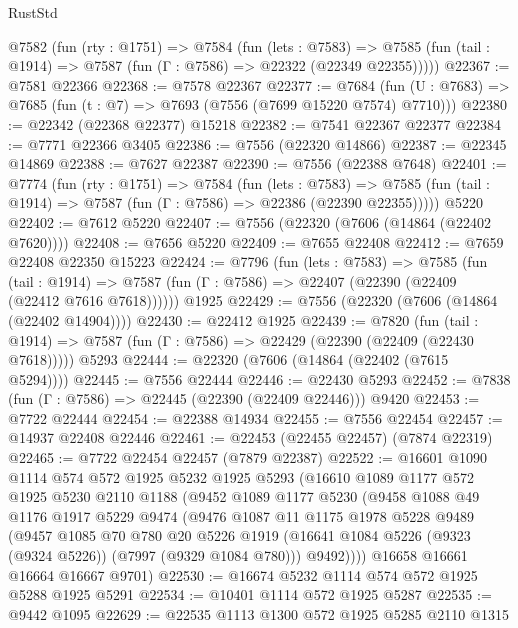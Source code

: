 \begin{lexlean}{RustStd}
\begin{coremodule}
{\begin{coremodule}
{{{{{{{{{{{{{{{{{{{{{{{{{{{{{{{{{{{{{{{{{{{  @7582
    (fun (rty : @1751) =>
    @7584
      (fun (lets : @7583) =>
      @7585 (fun (tail : @1914) => @7587 (fun (Γ : @7586) => @22322 (@22349 @22355)))))
@22367 := @7581 @22366
@22368 := @7578 @22367
@22377 := @7684
    (fun (U : @7683) => @7685 (fun (t : @7) => @7693 (@7556 (@7699 @15220 @7574) @7710)))
@22380 := @22342 (@22368 @22377) @15218
@22382 := @7541 @22367 @22377
@22384 := @7771 @22366 @3405
@22386 := @7556 (@22320 @14866)
@22387 := @22345 @14869
@22388 := @7627 @22387
@22390 := @7556 (@22388 @7648)
@22401 := @7774
    (fun (rty : @1751) =>
    @7584
      (fun (lets : @7583) =>
      @7585 (fun (tail : @1914) => @7587 (fun (Γ : @7586) => @22386 (@22390 @22355)))))
    @5220
@22402 := @7612 @5220
@22407 := @7556 (@22320 (@7606 (@14864 (@22402 @7620))))
@22408 := @7656 @5220
@22409 := @7655 @22408
@22412 := @7659 @22408 @22350 @15223
@22424 := @7796
    (fun (lets : @7583) =>
    @7585
      (fun (tail : @1914) =>
      @7587 (fun (Γ : @7586) => @22407 (@22390 (@22409 (@22412 @7616 @7618))))))
    @1925
@22429 := @7556 (@22320 (@7606 (@14864 (@22402 @14904))))
@22430 := @22412 @1925
@22439 := @7820
    (fun (tail : @1914) => @7587 (fun (Γ : @7586) => @22429 (@22390 (@22409 (@22430 @7618)))))
    @5293
@22444 := @22320 (@7606 (@14864 (@22402 (@7615 @5294))))
@22445 := @7556 @22444
@22446 := @22430 @5293
@22452 := @7838 (fun (Γ : @7586) => @22445 (@22390 (@22409 @22446))) @9420
@22453 := @7722 @22444
@22454 := @22388 @14934
@22455 := @7556 @22454
@22457 := @14937 @22408 @22446
@22461 := @22453 (@22455 @22457) (@7874 @22319)
@22465 := @7722 @22454 @22457 (@7879 @22387)
@22522 := @16601
    @1090
    @1114
    @574
    @572
    @1925
    @5232
    @1925
    @5293
    (@16610
      @1089
      @1177
      @572
      @1925
      @5230
      @2110
      @1188
      (@9452
        @1089
        @1177
        @5230
        (@9458
          @1088
          @49
          @1176
          @1917
          @5229
          @9474
          (@9476
            @1087
            @11
            @1175
            @1978
            @5228
            @9489
            (@9457
              @1085
              @70
              @780
              @20
              @5226
              @1919
              (@16641 @1084 @5226 (@9323 (@9324 @5226)) (@7997 (@9329 @1084 @780)))
              @9492))))
      @16658
      @16661
      @16664
      @16667
      @9701)
@22530 := @16674 @5232 @1114 @574 @572 @1925 @5288 @1925 @5291
@22534 := @10401 @1114 @572 @1925 @5287
@22535 := @9442 @1095
@22629 := @22535
    @1113
    @1300
    @572
    @1925
    @5285
    @2110
    @1315
}}}}}}}}}}}}}}}}}}}}}}}}}}}}}}}}}}}}}}}}}}}
\end{coremodule}}
\end{coremodule}
\end{lexlean}
